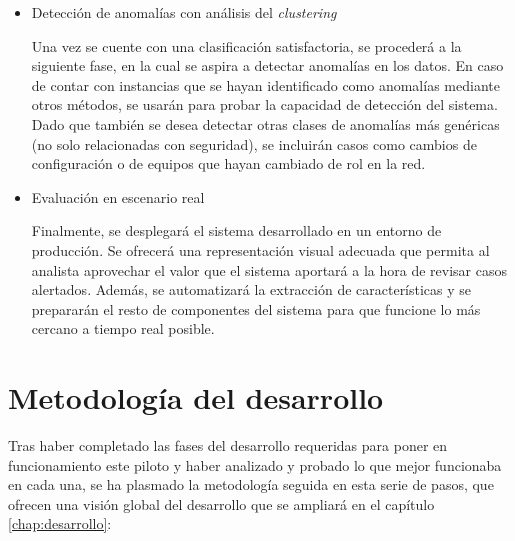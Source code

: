 \begin{itemize}
    \item Detección de anomalías con análisis del \emph{clustering}

Una vez se cuente con una clasificación satisfactoria, se procederá a la siguiente fase, en la cual se aspira a detectar anomalías en los datos.
En caso de contar con instancias que se hayan identificado como anomalías mediante otros métodos, se usarán para probar la capacidad de detección del sistema.
Dado que también se desea detectar otras clases de anomalías más genéricas (no solo relacionadas con seguridad), se incluirán casos como cambios de configuración o de equipos que hayan cambiado de rol en la red.

    \item Evaluación en escenario real

Finalmente, se desplegará el sistema desarrollado en un entorno de producción.
Se ofrecerá una representación visual adecuada que permita al analista aprovechar el valor que el sistema aportará a la hora de revisar casos alertados.
Además, se automatizará la extracción de características y se prepararán el resto de componentes del sistema para que funcione lo más cercano a tiempo real posible.

\end{itemize}

\section{Metodología del desarrollo}\label{sec:metodologiadesarrollo}

Tras haber completado las fases del desarrollo requeridas para poner en funcionamiento este piloto y haber analizado y probado lo que mejor funcionaba en cada una,
se ha plasmado la metodología seguida en esta serie de pasos, que ofrecen una visión global del desarrollo que se ampliará en el capítulo \ref{chap:desarrollo}:

